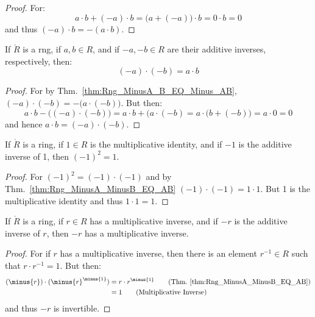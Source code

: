     \begin{proof}
        For:
        \begin{equation}
            a\cdot{b}+(\minus{a})\cdot{b}
            =\big(a+(\minus{a})\big)\cdot{b}
            =0\cdot{b}
            =0
        \end{equation}
        and thus $(\minus{a})\cdot{b}=\minus(a\cdot{b})$.
    \end{proof}
    \begin{theorem}
        \label{thm:Rng_MinusA_MinusB_EQ_AB}%
        If $\ring{R}$ is a rng, if $a,b\in{R}$, and if
        $\minus{a},\minus{b}\in{R}$ are their additive inverses,
        respectively, then:
        \begin{equation}
            (\minus{a})\cdot(\minus{b})=a\cdot{b}
        \end{equation}
    \end{theorem}
    \begin{proof}
        For by Thm.~\ref{thm:Rng_MinusA_B_EQ_Minus_AB},
        $(\minus{a})\cdot(\minus{b})=\minus\big(a\cdot(\minus{b})\big)$. But
        then:
        \begin{equation}
            a\cdot{b}-\big((\minus{a})\cdot(\minus{b})\big)
            =a\cdot{b}+(a\cdot(\minus{b})
            =a\cdot\big(b+(\minus{b})\big)
            =a\cdot{0}
            =0
        \end{equation}
        and hence $a\cdot{b}=(\minus{a})\cdot(\minus{b})$.
    \end{proof}
    \begin{theorem}
        \label{thm:Ring_Minus_1_Squared}%
        If $\ring{R}$ is a ring, if $1\in{R}$ is the multiplicative
        identity, and if $\minus{1}$ is the additive inverse of 1, then
        $(\minus{1})^{2}=1$.
    \end{theorem}
    \begin{proof}
        For $(\minus{1})^{2}=(\minus{1})\cdot(\minus{1})$ and by
        Thm.~\ref{thm:Rng_MinusA_MinusB_EQ_AB}
        $(\minus{1})\cdot(\minus{1})=1\cdot{1}$. But 1 is the multiplicative
        identity and thus $1\cdot{1}=1$.
    \end{proof}
    \begin{theorem}
        If $\ring{R}$ is a ring, if $r\in{R}$ has a multiplicative inverse,
        and if $\minus{r}$ is the additive inverse of $r$, then $\minus{r}$
        has a multiplicative inverse.
    \end{theorem}
    \begin{proof}
        For if $r$ has a multiplicative inverse, then there is an
        element $r^{\minus{1}}\in{R}$ such that $r\cdot{r}^{\minus{1}}=1$.
        But then:
        \begin{align}
            (\minus{r})\cdot(\minus{r}^{\minus{1}})&=r\cdot{r}^{\minus{1}}
                \tag{Thm.~\ref{thm:Rng_MinusA_MinusB_EQ_AB}}\\
            &=1\tag{Multiplicative Inverse}
        \end{align}
        and thus $\minus{r}$ is invertible.
    \end{proof}
